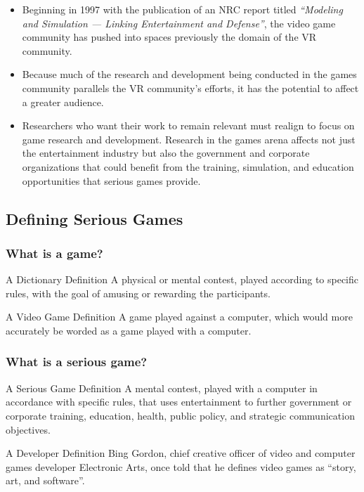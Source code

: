 \begin{frame}
\begin{itemize}[<+->]
\item
Beginning in 1997 with the publication of an NRC report titled \emph{``Modeling
and Simulation --- Linking Entertainment and Defense''}, the video game
community has pushed into spaces previously the domain of the VR community.
\item
Because much of the research
and development being conducted in the games community parallels the VR
community’s efforts, it has the potential to affect a greater audience.
\item
Researchers who want their work to remain relevant must realign to focus on
game research and development. Research in the games arena affects not just
the entertainment industry but also the government and corporate organizations
that could benefit from the training, simulation, and education opportunities
that serious games provide.
\end{itemize}
\end{frame}

\subsection{Defining Serious Games}

\begin{frame}
\frametitle{What is a game?}
\begin{block}{A Dictionary Definition}
A physical or mental contest, played according to specific rules,
with the goal of amusing or rewarding the participants.
\end{block}
\pause
\begin{block}{A Video Game Definition}
A game played \alert{against a computer}, which would more
accurately be worded as a game played \alert{with a computer}.
\end{block}
\end{frame}

\begin{frame}
\frametitle{What is a serious game?}
\begin{block}{A Serious Game Definition}
A mental contest, played with a computer in accordance with
specific rules, \alert{that uses entertainment to} further government or
corporate training, education, health, public policy, and strategic
communication objectives.
\end{block}
\pause
\begin{block}{A Developer Definition}
Bing Gordon, chief creative officer of video and
computer games developer Electronic Arts, once
told that he defines video games as \alert{``story, art,
and software''}.
\end{block}
\end{frame}

